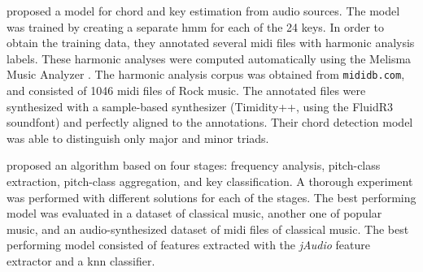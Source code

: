 

\textcite{lee2007unified} proposed a model for chord and key
estimation from audio sources. The model was trained by
creating a separate \gls{hmm} for each of the 24 keys. In
order to obtain the training data, they annotated several
\gls{midi} files with harmonic analysis labels. These
harmonic analyses were computed automatically using the
Melisma Music Analyzer \parencite{temperley2004cognition}.
The harmonic analysis corpus was obtained from
\texttt{mididb.com}, and consisted of 1046 \gls{midi} files
of Rock music. The annotated files were synthesized with a
sample-based synthesizer (Timidity++, using the FluidR3
soundfont) and perfectly aligned to the annotations. Their
chord detection model was able to distinguish only major and
minor triads.





\textcite{campbell2010automatic} proposed an algorithm based
on four stages: frequency analysis, pitch-class extraction,
pitch-class aggregation, and key classification. A thorough
experiment was performed with different solutions for each
of the stages. The best performing model was evaluated in a
dataset of classical music, another one of popular music,
and an audio-synthesized dataset of \gls{midi} files of
classical music. The best performing model consisted of
features extracted with the \emph{jAudio} feature extractor
\parencite{mcennis2005jaudio} and a \gls{knn} classifier.

